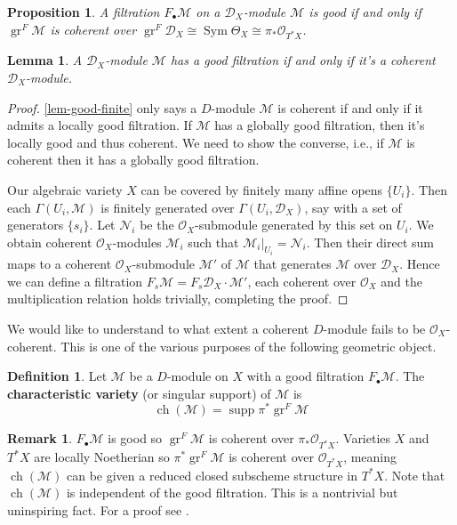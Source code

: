 \documentclass[11pt, a4paper]{article}
\newtheorem{lemma}[theorem]{Lemma}
\newtheorem{proposition}[theorem]{Proposition}
\theoremstyle{definition}
\newtheorem{remark}[theorem]{Remark}
\newtheorem{definition}[theorem]{Definition}
\newcommand{\gr}{\operatorname{gr}}
\newcommand{\Sym}[0]{\operatorname{Sym}}
\newcommand{\ch}{\operatorname{ch}}
\newcommand{\supp}{\operatorname{supp}}
\begin{document}
    \begin{proposition}
        A filtration $F_\bullet\mathcal M$ on a $\mathcal D_X$-module $\mathcal M$ is good if and only if $\gr^F\mathcal M$ is coherent over $\gr^F\mathcal D_X\cong\Sym\Theta_X\cong\pi_*\mathcal O_{T^*X}$.
    \end{proposition}
    \begin{lemma}\label{lem-coherent-iff-good}
        A $\mathcal D_X$-module $\mathcal M$ has a good filtration if and only if it's a coherent $\mathcal D_X$-module.
    \end{lemma}
    \begin{proof}
        \cref{lem-good-finite} only says a $D$-module $\mathcal M$ is coherent if and only if it admits a locally good filtration. If $\mathcal M$ has a globally good filtration, then it's locally good and thus coherent. We need to show the converse, i.e., if $\mathcal M$ is coherent then it has a globally good filtration.

        Our algebraic variety $X$ can be covered by finitely many affine opens $\{U_i\}$. Then each $\Gamma(U_i,\mathcal M)$ is finitely generated over $\Gamma(U_i,\mathcal D_X)$, say with a set of generators $\{s_i\}$. Let $\mathcal N_{i}$ be the $\mathcal O_X$-submodule generated by this set on $U_i$. We obtain coherent $\mathcal O_X$-modules $\mathcal M_i$ such that $\mathcal M_i|_{U_i}=\mathcal N_i$. Then their direct sum maps to a coherent $\mathcal O_X$-submodule $\mathcal M'$ of $\mathcal M$ that generates $\mathcal M$ over $\mathcal D_X$. Hence we can define a filtration $F_s\mathcal M=F_s\mathcal D_X\cdot\mathcal M'$, each coherent over $\mathcal O_X$ and the multiplication relation holds trivially, completing the proof.  
    \end{proof}
    We would like to understand to what extent a coherent $D$-module fails to be $\mathcal O_X$-coherent. This is one of the various purposes of the following geometric object.
    \begin{definition}
        Let $\mathcal M$ be a $D$-module on $X$ with a good filtration $F_\bullet\mathcal M$. The \textbf{characteristic variety} (or singular support) of $\mathcal M$ is
        \[\ch(\mathcal M)=\supp\pi^*\gr^F\mathcal M\]
    \end{definition}
    \begin{remark}
        $F_\bullet \mathcal M$ is good so $\gr^F\mathcal M$ is coherent over $\pi_*\mathcal O_{T^*X}$. Varieties $X$ and $T^*X$ are locally Noetherian so $\pi^*\gr^F\mathcal M$ is coherent over $\mathcal O_{T^*X}$, meaning $\ch(\mathcal M)$ can be given a reduced closed subscheme structure in $T^*X$. Note that $\ch(\mathcal M)$ is independent of the good filtration. This is a nontrivial but uninspiring fact. For a proof see \cite{bernstein-notes}. 
    \end{remark}
\end{document}
